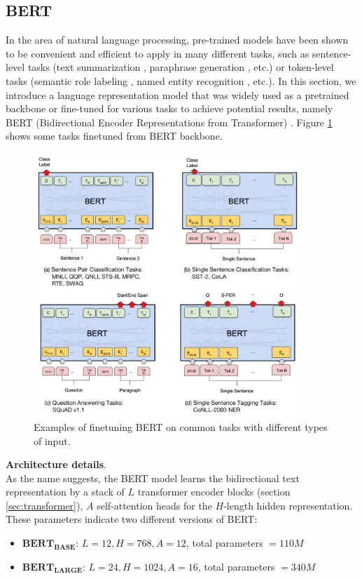 \subsection{BERT}
\label{sec:BERT}
In the area of natural language processing, pre-trained models have been shown to be convenient and efficient to apply in many different tasks, such as sentence-level tasks (text summarization \cite{jadhav2018extractive, liu2018generative}, paraphrase generation \cite{wieting2017paranmt}, etc.) or token-level tasks (semantic role labeling \cite{he2018jointly,shi2019simple}, named entity recognition \cite{baevski2019cloze,strakova2019neural}, etc.). In this section, we introduce a language representation model that was widely used as a pretrained backbone or fine-tuned for various tasks to achieve potential results, namely BERT (Bidirectional Encoder Representations from Transformer) \cite{devlin2018bert}. Figure \ref{fig:BERT_finetune} shows some tasks finetuned from BERT backbone.
\begin{figure}[t!]
    \centering
    \includegraphics[width=0.9\textwidth]{images/BERT_finetune.png}
    \caption{Examples of finetuning BERT on common tasks with different types of input. \cite{devlin2018bert}}
    \label{fig:BERT_finetune}
\end{figure}
\textbf{Architecture details}. \\
As the name suggests, the BERT model learns the bidirectional text representation by a stack of $L$ transformer encoder blocks (section \ref{sec:transformer}), $A$ self-attention heads for the $H$-length hidden representation. These parameters indicate two different versions of BERT: 
\begin{itemize}
    \item $\mathbf{BERT_{BASE}}$: $L = 12, H = 768, A = 12$, total parameters $= 110M$
    \item $\mathbf{BERT_{LARGE}}$: $L = 24, H = 1024, A = 16$, total parameters $= 340M$
\end{itemize}

